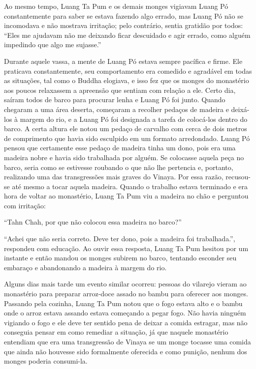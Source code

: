 Ao mesmo tempo, Luang Ta Pum e os demais monges vigiavam Luang Pó
constantemente para saber se estava fazendo algo errado, mas Luang Pó
não se incomodava e não mostrava irritação; pelo contrário, sentia
gratidão por todos: ``Eles me ajudavam não me deixando ficar descuidado
e agir errado, como alguém impedindo que algo me sujasse.''

Durante aquele vassa, a mente de Luang Pó estava sempre pacífica e
firme. Ele praticava constantemente, seu comportamento era comedido e
agradável em todas as situações, tal como o Buddha elogiava, e isso fez
que os monges do monastério aos poucos relaxassem a apreensão que
sentiam com relação a ele. Certo dia, saíram todos de barco para
procurar lenha e Luang Pó foi junto. Quando chegaram a uma área deserta,
começaram a recolher pedaços de madeira e deixá-los à margem do rio, e a
Luang Pó foi designada a tarefa de colocá-los dentro do barco. A certa
altura ele notou um pedaço de carvalho com cerca de dois metros de
comprimento que havia sido esculpido em um formato arredondado. Luang Pó
pensou que certamente esse pedaço de madeira tinha um dono, pois era uma
madeira nobre e havia sido trabalhada por alguém. Se colocasse aquela
peça no barco, seria como se estivesse roubando o que não lhe pertencia
e, portanto, realizando uma das transgressões mais graves do Vinaya. Por
essa razão, recusou-se até mesmo a tocar aquela madeira. Quando o
trabalho estava terminado e era hora de voltar ao monastério, Luang Ta
Pum viu a madeira no chão e perguntou com irritação:

``Tahn Chah, por que não colocou essa madeira no barco?''

``Achei que não seria correto. Deve ter dono, pois a madeira foi
trabalhada.'', respondeu com educação. Ao ouvir essa resposta, Luang Ta
Pum hesitou por um instante e então mandou os monges subirem no barco,
tentando esconder seu embaraço e abandonando a madeira à margem do rio.

Alguns dias mais tarde um evento similar ocorreu: pessoas do vilarejo
vieram ao monastério para preparar arroz-doce assado no bambu para
oferecer aos monges. Passando pela cozinha, Luang Ta Pum notou que o
fogo estava alto e o bambu onde o arroz estava assando estava começando
a pegar fogo. Não havia ninguém vigiando o fogo e ele deve ter sentido
pena de deixar a comida estragar, mas não conseguia pensar em como
remediar a situação, já que naquele monastério entendiam que era uma
transgressão de Vinaya se um monge tocasse uma comida que ainda não
houvesse sido formalmente oferecida e como punição, nenhum dos monges
poderia consumi-la.

